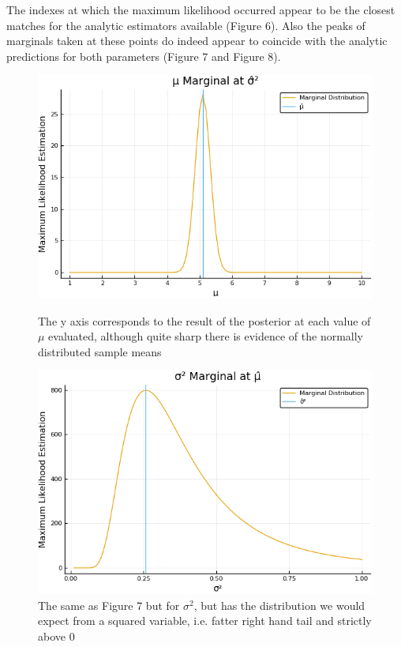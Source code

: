 \documentclass[a4paper,12pt,notitlepage]{article}
\begin{document}
The indexes at which the maximum likelihood occurred appear to be the closest matches for the analytic estimators available (Figure 6). Also the peaks of marginals taken at these points do indeed appear to coincide with the analytic predictions for both parameters (Figure 7 and Figure 8).
\begin{figure}[h]
\centering
\includegraphics[width=13cm,8cm]{mu_marginal.png}
\caption{The y axis corresponds to the result of the posterior at each value of $\mu$ evaluated, although quite sharp there is evidence of the normally distributed sample means}
\centering
\includegraphics[width=13cm,8cm]{sigma_marginal.png}
\caption{The same as Figure 7 but for $\sigma^2$, but has the distribution we would expect from a squared variable, i.e. fatter right hand tail and strictly above 0}
\end{figure}
\end{document}
